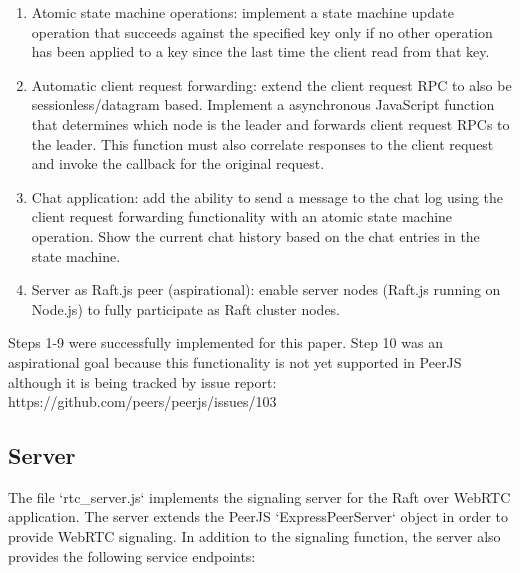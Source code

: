 \documentclass{acmtog} %
\begin{document}
\begin{enumerate}
\item Atomic state machine operations: implement a state machine update operation that succeeds against the specified key only if no other operation has been applied to a key since the last time the client read from that key.

\item Automatic client request forwarding: extend the client request RPC to also be sessionless/datagram based. Implement a asynchronous JavaScript function that determines which node is the leader and forwards client request RPCs to the leader. This function must also correlate responses to the client request and invoke the callback for the original request.

\item Chat application: add the ability to send a message to the chat log using the client request forwarding functionality with an atomic state machine operation. Show the current chat history based on the chat entries in the state machine.

\item Server as Raft.js peer (aspirational): enable server nodes (Raft.js running on Node.js) to fully participate as Raft cluster nodes.
\end{enumerate}

Steps 1-9 were successfully implemented for this paper. Step 10 was an
aspirational goal because this functionality is not yet supported in
PeerJS although it is being tracked by issue report:
https://github.com/peers/peerjs/issues/103

\subsection{Server}

The file `rtc\_server.js` implements the signaling server for the Raft
over WebRTC application. The server extends the PeerJS
`ExpressPeerServer` object in order to provide WebRTC signaling. In
addition to the signaling function, the server also provides the
following service endpoints:
\end{document}
